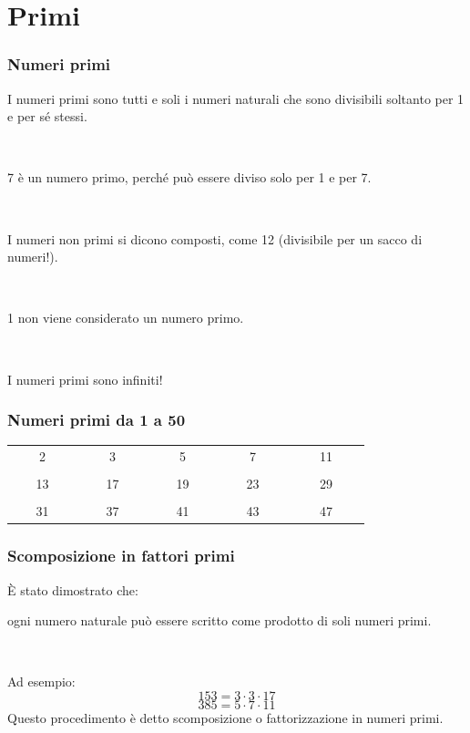 \documentclass[]{beamer}
\theoremstyle{plain}
\begin{document}
\section{Primi}



\begin{frame}
\frametitle{Numeri primi}
I numeri primi sono tutti e soli i numeri naturali che sono \alert{divisibili soltanto per 1 e per sé stessi}.\pause

~

7 è un numero primo, perché può essere diviso solo per 1 e per 7.\pause

~

I numeri non primi si dicono composti, come 12 (divisibile per un sacco di numeri!).\pause

~

1 non viene considerato un numero primo.\pause

~

I numeri primi sono \alert{infiniti}!
\end{frame}


\begin{frame}
\frametitle{Numeri primi da 1 a 50}
\begin{table}[]
  \begin{tabular}{ccccc}
  ~~~~2~~~~  & ~~~~3~~~~  & ~~~~5~~~~  & ~~~~7~~~~  & ~~~~11~~~~ \\
  &&&& \\
  13 & 17 & 19 & 23 & 29 \\
  &&&& \\
  31 & 37 & 41 & 43 & 47                    
  \end{tabular}
  \end{table}
\end{frame}





\begin{frame}
\frametitle{Scomposizione in fattori primi}
È stato dimostrato che:
\begin{center}
  \alert{ogni numero naturale può essere scritto come prodotto di soli numeri primi.}
\end{center}\pause

~

Ad esempio:\[ 153 = 3 \cdot 3 \cdot 17 \]\pause\[ 385 = 5 \cdot 7 \cdot 11 \]\pause
Questo procedimento è detto \alert{scomposizione o fattorizzazione} in numeri primi.
\end{frame}
\end{document}
